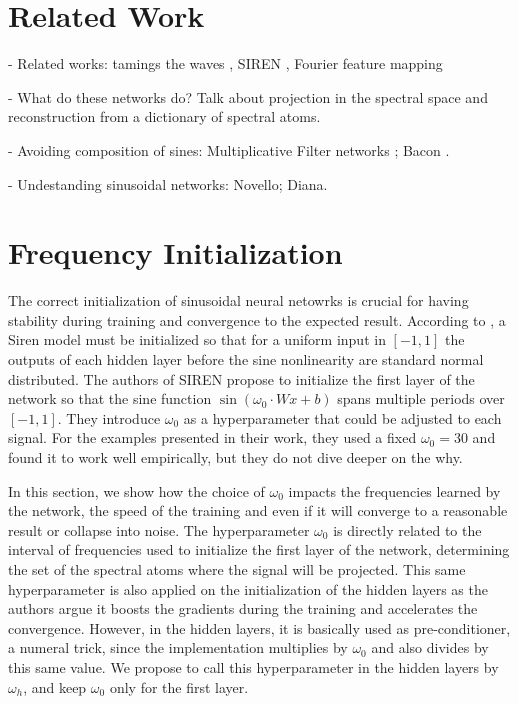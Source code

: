 \section{Related Work}

- Related works: tamings the waves \cite{taming2017} , SIREN \cite{sitzmann2019siren}, Fourier feature mapping \cite{tancik2020fourfeat}

- What do these networks do? Talk about projection in the spectral space and reconstruction from a dictionary of spectral atoms.

- Avoiding composition of sines: Multiplicative Filter networks \cite{fathony2020multiplicative}; Bacon \cite{bacon2021}.

- Undestanding sinusoidal networks: Novello; Diana.


\section{Frequency Initialization}

The correct initialization of sinusoidal neural netowrks is crucial for having stability during training and convergence to the expected result. According to \cite{sitzmann2019siren}, a Siren model must be initialized so that for a uniform input in $[-1, 1]$ the outputs of each hidden layer before the sine nonlinearity are standard normal distributed. The authors of SIREN propose to initialize the first layer of the network so that the sine function $\sin(\omega_0 \cdot W x + b)$
spans multiple periods over $[-1, 1]$. They introduce $\omega_0$ as a hyperparameter that could be adjusted to each signal. For the examples presented in their work, they used a fixed $\omega_0=30$ and found it to work well empirically, but they do not dive deeper on the why. 

In this section, we show how the choice of $\omega_0$  impacts the frequencies learned by the network, the speed of the training and even if it will converge to a reasonable result or collapse into noise. The hyperparameter $\omega_0$ is directly related to the interval of frequencies used to initialize the first layer of the network, determining the set of the spectral atoms where the signal will be projected. This same hyperparameter is also applied on the initialization of the hidden layers as the authors argue it boosts the gradients during the training and accelerates the convergence. However, in the hidden layers, it is basically used as pre-conditioner, a numeral trick, since the implementation multiplies by $\omega_0$ and also divides by this same value. We propose to call this hyperparameter in the hidden layers by $\omega_h$, and keep $\omega_0$ only for the first layer.


